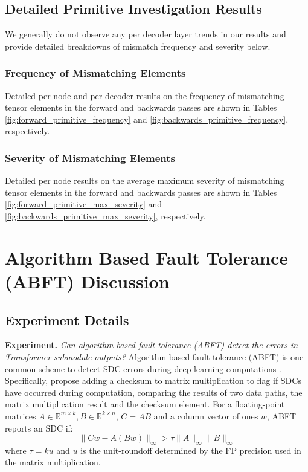 \subsection{Detailed Primitive Investigation Results} \label{appendix:primitive_investigation_detailed_results}

We generally do not observe any per decoder layer trends in our results and provide detailed breakdowns of mismatch frequency and severity below.

\subsubsection{Frequency of Mismatching Elements}
Detailed per node and per decoder results on the frequency of mismatching tensor elements in the forward and backwards passes are shown in Tables \ref{fig:forward_primitive_frequency} and \ref{fig:backwards_primitive_frequency}, respectively.

\subsubsection{Severity of Mismatching Elements}
Detailed per node results on the average maximum severity of mismatching tensor elements in the forward and backwards passes are shown in Tables \ref{fig:forward_primitive_max_severity} and \ref{fig:backwards_primitive_max_severity}, respectively.

\section{Algorithm Based Fault Tolerance (ABFT) Discussion}  \label{appendix:abft}

\subsection{Experiment Details}

\textbf{Experiment.} \emph{Can algorithm-based fault tolerance (ABFT) detect the errors in Transformer submodule outputs?}
Algorithm-based fault tolerance (ABFT) is one common scheme to detect SDC errors during deep learning computations \cite{Zhao_2021, xue2023approxabftapproximatealgorithmbasedfault}. Specifically, \citet{utexas_abft} propose adding a checksum to matrix multiplication to flag if SDCs have occurred during computation, comparing the results of two data paths, the matrix multiplication result and the checksum element. For a floating-point matrices $A \in \mathbb{R}^{m \times k}, B \in \mathbb{R}^{k\times n}$, $C = AB$ and a column vector of ones $w$, ABFT reports an SDC if:
\begin{equation}
    \label{equation:abft_condition}
    \| C w - A( Bw) \|_\infty > \tau  \| A \|_\infty \| B \|_\infty
\end{equation}
where $\tau = ku$ and $u$ is the unit-roundoff determined by the FP precision used in the matrix multiplication. 


